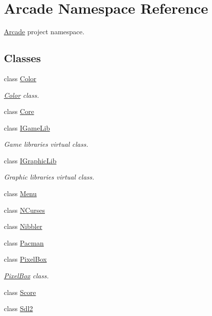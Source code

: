 \hypertarget{namespace_arcade}{}\section{Arcade Namespace Reference}
\label{namespace_arcade}


\hyperlink{namespace_arcade}{Arcade} project namespace.  


\subsection*{Classes}
\begin{DoxyCompactItemize}
\item 
class \hyperlink{class_arcade_1_1_color}{Color}
\begin{DoxyCompactList}\small\item\em \hyperlink{class_arcade_1_1_color}{Color} class. \end{DoxyCompactList}\item 
class \hyperlink{class_arcade_1_1_core}{Core}
\item 
class \hyperlink{class_arcade_1_1_i_game_lib}{I\+Game\+Lib}
\begin{DoxyCompactList}\small\item\em Game libraries virtual class. \end{DoxyCompactList}\item 
class \hyperlink{class_arcade_1_1_i_graphic_lib}{I\+Graphic\+Lib}
\begin{DoxyCompactList}\small\item\em Graphic libraries virtual class. \end{DoxyCompactList}\item 
class \hyperlink{class_arcade_1_1_menu}{Menu}
\item 
class \hyperlink{class_arcade_1_1_n_curses}{N\+Curses}
\item 
class \hyperlink{class_arcade_1_1_nibbler}{Nibbler}
\item 
class \hyperlink{class_arcade_1_1_pacman}{Pacman}
\item 
class \hyperlink{class_arcade_1_1_pixel_box}{Pixel\+Box}
\begin{DoxyCompactList}\small\item\em \hyperlink{class_arcade_1_1_pixel_box}{Pixel\+Box} class. \end{DoxyCompactList}\item 
class \hyperlink{class_arcade_1_1_score}{Score}
\item 
class \hyperlink{class_arcade_1_1_sdl2}{Sdl2}

\end{DoxyCompactItemize}
